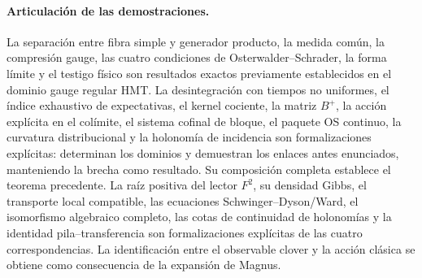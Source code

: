 \paragraph{Articulación de las demostraciones.}
La separación entre fibra simple y generador producto, la medida común, la compresión
gauge, las cuatro condiciones de Osterwalder--Schrader, la forma límite y el testigo físico son
resultados exactos previamente establecidos en el dominio gauge
regular HMT. La desintegración con tiempos no uniformes, el índice
exhaustivo de expectativas, el kernel cociente, la matriz $B^+$, la acción explícita
en el colímite, el sistema cofinal de bloque, el paquete OS continuo, la curvatura
distribucional y la holonomía de incidencia son
formalizaciones explícitas: determinan los dominios y demuestran los enlaces antes
enunciados, manteniendo la brecha como resultado. Su composición completa
establece el teorema precedente.
La raíz positiva del lector $F^2$, su densidad Gibbs, el transporte local compatible,
las ecuaciones Schwinger--Dyson/Ward, el isomorfismo algebraico completo, las cotas
de continuidad de holonomías y la identidad pila--transferencia son
formalizaciones explícitas de las cuatro correspondencias. La identificación
entre el observable clover y la acción clásica se obtiene como consecuencia
de la expansión de Magnus.
